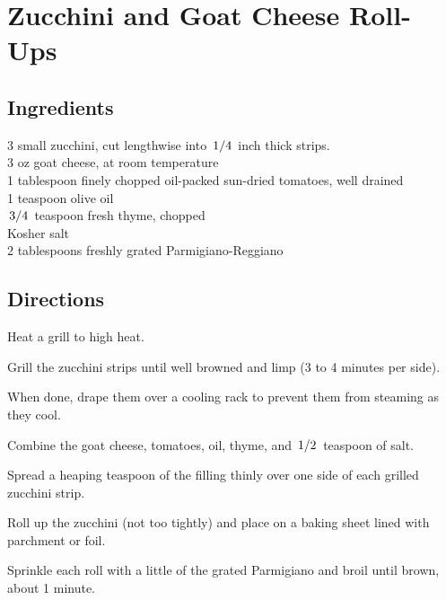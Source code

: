 \documentclass{article}
\newcounter{qcounter}
\begin{document}
\newcommand{\slfrac}[2]{\left.#1\middle/#2\right.}
\newcommand{\degree}{\ensuremath{^\circ}}

\section*{Zucchini and Goat Cheese Roll-Ups}



\subsection*{Ingredients}
3 small zucchini, cut lengthwise into $\slfrac{1}{4}$ inch thick strips.\\
3 oz goat cheese, at room temperature\\
1 tablespoon finely chopped oil-packed sun-dried tomatoes, well drained\\
1 teaspoon olive oil\\
$\slfrac{3}{4}$ teaspoon fresh thyme, chopped\\
Kosher salt\\
2 tablespoons freshly grated Parmigiano-Reggiano

\subsection*{Directions}
\begin{list}{:~}{}
\item Heat a grill to high heat.
\item Grill the zucchini strips until well browned and limp (3 to 4 minutes per side).
\item When done, drape them over a cooling rack to prevent them from steaming as they cool.
\item Combine the goat cheese, tomatoes, oil, thyme, and $\slfrac{1}{2}$ teaspoon of salt.
\item Spread a heaping teaspoon of the filling thinly over one side of each grilled zucchini strip.
\item Roll up the zucchini (not too tightly) and place on a baking sheet lined with parchment or foil.
\item Sprinkle each roll with a little of the grated Parmigiano and broil until brown, about 1 minute.
\end{list}
\end{document}
